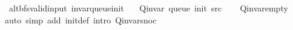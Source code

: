 \begin{isabellebody}
{}
\isamarkuptrue%
%
\endisatagdocument
{\isafolddocument}%
%
\isadelimdocument
%
\endisadelimdocument
{}\isamarkupfalse%
\ {\isacharparenleft}{\kern0pt}\ alt{\isacharunderscore}{\kern0pt}bfs{\isacharunderscore}{\kern0pt}valid{\isacharunderscore}{\kern0pt}input{\isacharparenright}{\kern0pt}\ invar{\isacharunderscore}{\kern0pt}queue{\isacharunderscore}{\kern0pt}init{\isacharcolon}{\kern0pt}\isanewline
\ \ \ {\isachardoublequoteopen}Q{\isacharunderscore}{\kern0pt}invar\ {\isacharparenleft}{\kern0pt}queue\ {\isacharparenleft}{\kern0pt}init\ src{\isacharparenright}{\kern0pt}{\isacharparenright}{\kern0pt}{\isachardoublequoteclose}\isanewline
%
\isadelimproof
\ \ %
\endisadelimproof
%
\isatagproof
{}\isamarkupfalse%
\ Q{\isachardot}{\kern0pt}invar{\isacharunderscore}{\kern0pt}empty\isanewline
\ \ \isamarkupfalse%
\ {\isacharparenleft}{\kern0pt}auto\ simp\ add{\isacharcolon}{\kern0pt}\ init{\isacharunderscore}{\kern0pt}def\ intro{\isacharcolon}{\kern0pt}\ Q{\isachardot}{\kern0pt}invar{\isacharunderscore}{\kern0pt}snoc{\isacharparenright}{\kern0pt}%
\endisatagproof
{\isafoldproof}%
%
\isadelimproof
%
\endisadelimproof
%
\isadelimdocument
%
\endisadelimdocument
%
\isatagdocument
%

\end{isabellebody}
